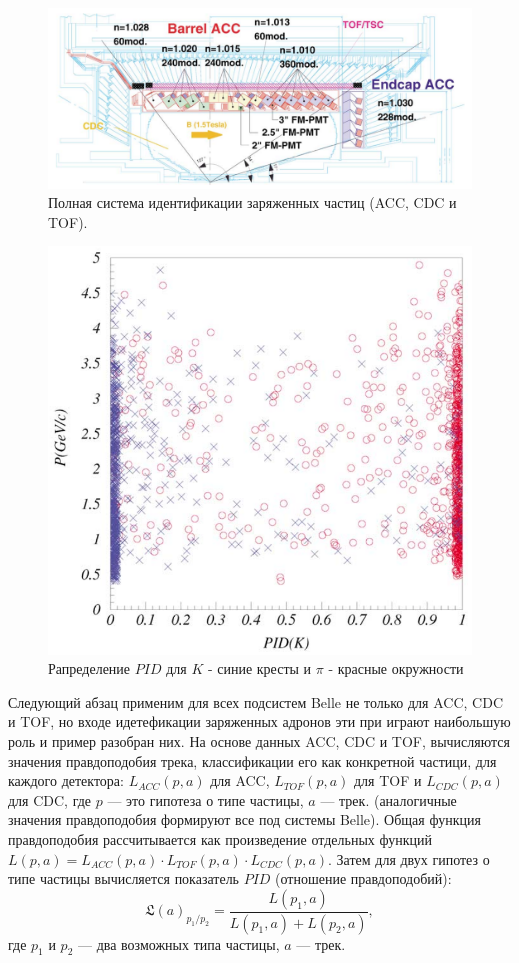 \begin{figure}[!htb]
    \centering
    \includegraphics[width=1\linewidth]{img/Ch_hadr_id.png}
    \caption{Полная система идентификации заряженных частиц (ACC, CDC и TOF).}
    \label{the:ch_hadr_id}
\end{figure}

\begin{figure}
    \centering
    \includegraphics[width=0.7\linewidth]{img/L_P.png}
    \caption{Рапределение $PID$ для $K$ - синие кресты и $\pi$ - красные окружности}
    \label{the:li}
\end{figure}

Следующий абзац применим для всех подсистем Belle не только для ACC, CDC и TOF, 
но входе идетефикации заряженных адронов эти при играют наибольшую роль и пример разобран них.
На основе данных ACC, CDC и TOF, вычисляются значения правдоподобия трека, классификации его как конкретной частици, 
для каждого детектора: $L_{ACC}(p,a)$ для ACC, 
$L_{TOF}(p,a)$ для TOF и $L_{CDC}(p,a)$ для CDC, где $p$ --- это гипотеза о типе частицы, $a$ --- трек.
(аналогичные значения правдоподобия формируют все под системы Belle). 
Общая функция правдоподобия рассчитывается как произведение отдельных функций 
$L(p,a) = L_{ACC}(p,a) \cdot L_{TOF}(p,a) \cdot L_{CDC}(p,a)$.
Затем для двух гипотез о типе частицы вычисляется показатель $PID$ (отношение правдоподобий):
\begin{equation}
    \mathfrak{L}(a)_{p_1/p_2} = \frac{L(p_1,a)}{L(p_1,a) + L(p_2,a)},
\end{equation}
где $p_1$ и $p_2$ — два возможных типа частицы, $a$ --- трек.

